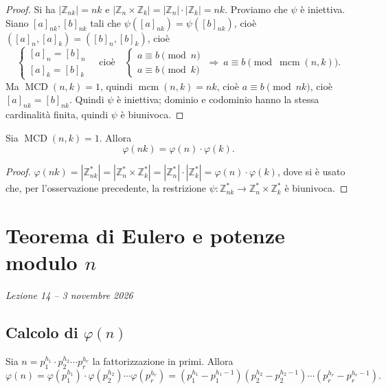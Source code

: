 \documentclass[11pt,a4paper]{article}
\begin{document}
\begin{proof}
Si ha $|\mathbb{Z}_{nk}| = nk$ e $|\mathbb{Z}_n\times\mathbb{Z}_k| = |\mathbb{Z}_n|\cdot|\mathbb{Z}_k| = nk$. Proviamo che $\psi$ è iniettiva. Siano $[a]_{nk}, [b]_{nk}$ tali che $\psi([a]_{nk}) = \psi([b]_{nk})$, cioè $([a]_n, [a]_k) = ([b]_n, [b]_k)$, cioè
\[
  \begin{cases} [a]_n = [b]_n \\ [a]_k = [b]_k \end{cases}
  \quad\text{cioè}\quad
  \begin{cases} a \equiv b \pmod n \\ a \equiv b \pmod k \end{cases}
  \ \Rightarrow\ a \equiv b \pmod{\operatorname{mcm}(n, k)} .
\]
Ma $\operatorname{MCD}(n, k) = 1$, quindi $\operatorname{mcm}(n, k) = nk$, cioè $a \equiv b \pmod{nk}$, cioè $[a]_{nk} = [b]_{nk}$. Quindi $\psi$ è iniettiva; dominio e codominio hanno la stessa cardinalità finita, quindi $\psi$ è biunivoca.
\end{proof}

\begin{proposizione}
Sia $\operatorname{MCD}(n, k) = 1$. Allora
\[
  \varphi(nk) = \varphi(n)\cdot\varphi(k) .
\]
\end{proposizione}

\begin{proof}
$\varphi(nk) = |\mathbb{Z}_{nk}^*| = |\mathbb{Z}_n^*\times\mathbb{Z}_k^*| = |\mathbb{Z}_n^*|\cdot|\mathbb{Z}_k^*| = \varphi(n)\cdot\varphi(k)$, dove si è usato che, per l'osservazione precedente, la restrizione $\psi : \mathbb{Z}_{nk}^* \to \mathbb{Z}_n^*\times\mathbb{Z}_k^*$ è biunivoca.
\end{proof}

\section[Teorema di Eulero e potenze modulo $n$ (Lezione 14 -- 3 novembre 2026)]{Teorema di Eulero e potenze modulo $n$}
\noindent\emph{Lezione 14 -- 3 novembre 2026}
\subsection{Calcolo di $\varphi(n)$}

\begin{teorema}[Corollario]
Sia $n = p_1^{h_1}\cdot p_2^{h_2}\cdots p_r^{h_r}$ la fattorizzazione in primi. Allora
\[
  \varphi(n) = \varphi(p_1^{h_1})\cdot\varphi(p_2^{h_2})\cdots\varphi(p_r^{h_r}) = \left(p_1^{h_1} - p_1^{h_1 - 1}\right)\left(p_2^{h_2} - p_2^{h_2 - 1}\right)\cdots\left(p_r^{h_r} - p_r^{h_r - 1}\right).
\]
\end{teorema}
\end{document}
